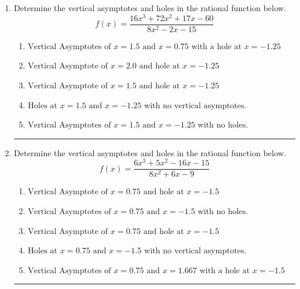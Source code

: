 \documentclass[14pt]{extbook}
\newcommand{\litem}[1]{\item#1\hspace*{-1cm}\rule{\textwidth}{0.4pt}}
\begin{document}
\begin{enumerate}
\litem{
Determine the vertical asymptotes and holes in the rational function below.\[ f(x) = \frac{16x^{3} +72 x^{2} +17 x -60}{8x^{2} -2 x -15} \]\begin{enumerate}[label=\Alph*.]
\item \( \text{Vertical Asymptotes of } x = 1.5 \text{ and } x = 0.75 \text{ with a hole at } x = -1.25 \)
\item \( \text{Vertical Asymptote of } x = 2.0 \text{ and hole at } x = -1.25 \)
\item \( \text{Vertical Asymptote of } x = 1.5 \text{ and hole at } x = -1.25 \)
\item \( \text{Holes at } x = 1.5 \text{ and } x = -1.25 \text{ with no vertical asymptotes.} \)
\item \( \text{Vertical Asymptotes of } x = 1.5 \text{ and } x = -1.25 \text{ with no holes.} \)

\end{enumerate} }
\litem{
Determine the vertical asymptotes and holes in the rational function below.\[ f(x) = \frac{6x^{3} +5 x^{2} -16 x -15}{8x^{2} +6 x -9} \]\begin{enumerate}[label=\Alph*.]
\item \( \text{Vertical Asymptote of } x = 0.75 \text{ and hole at } x = -1.5 \)
\item \( \text{Vertical Asymptotes of } x = 0.75 \text{ and } x = -1.5 \text{ with no holes.} \)
\item \( \text{Vertical Asymptote of } x = 0.75 \text{ and hole at } x = -1.5 \)
\item \( \text{Holes at } x = 0.75 \text{ and } x = -1.5 \text{ with no vertical asymptotes.} \)
\item \( \text{Vertical Asymptotes of } x = 0.75 \text{ and } x = 1.667 \text{ with a hole at } x = -1.5 \)


\end{enumerate}}
\end{enumerate}
\end{document}
